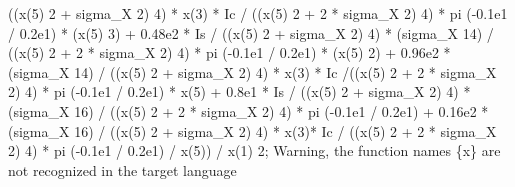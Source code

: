 \begin{maplegroup}
((x(5)  2 + sigma\_X  2)  4) * x(3) * Ic / ((x(5)  2 + 2 * sigma\_X 2)  4) * pi  (-0.1e1 / 0.2e1) * (x(5)  3) + 0.48e2 * Is / ((x(5)  2 + sigma\_X  2)  4) * (sigma\_X  14) / ((x(5)  2 + 2 * sigma\_X  2)  4) * pi  (-0.1e1 / 0.2e1) * (x(5)  2) + 0.96e2 * (sigma\_X  14) / ((x(5)  2 + sigma\_X  2)  4) * x(3) * Ic /((x(5)  2 + 2 * sigma\_X  2)  4) * pi  (-0.1e1 / 0.2e1) * x(5) + 0.8e1 * Is / ((x(5)  2 + sigma\_X  2)  4) * (sigma\_X  16) / ((x(5)  2 + 2 * sigma\_X  2)  4) * pi  (-0.1e1 / 0.2e1) + 0.16e2 * (sigma\_X  16) / ((x(5)  2 + sigma\_X  2)  4) * x(3)* Ic / ((x(5)  2 + 2 * sigma\_X  2)  4) * pi  (-0.1e1 / 0.2e1) / x(5)) / x(1)  2;
\underline{}Warning, the function names \{x\} are not recognized in the target language\underline{}\mapleresult

\end{maplegroup}

